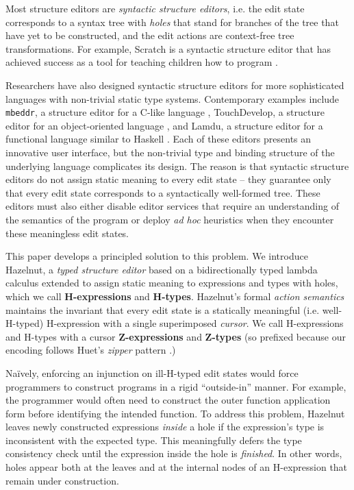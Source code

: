 Most structure editors are \emph{syntactic structure editors}, i.e. the
edit state corresponds to a syntax tree with \emph{holes} that stand for branches of
the tree that have yet to be constructed, and the edit actions are
context-free tree transformations. For example, Scratch is a syntactic
structure editor that has achieved success as a tool for teaching children
how to program \cite{Resnick:2009:SP:1592761.1592779}. %

Researchers have also 
 designed  syntactic structure editors for more sophisticated languages with non-trivial  
static type systems. Contemporary examples include \texttt{mbeddr}, a structure editor for a C-like
language \cite{voelter_mbeddr:_2012}, TouchDevelop, a structure editor for an
object-oriented language \cite{tillmann_touchdevelop:_2011}, and Lamdu, a structure 
editor for a functional language similar to Haskell \cite{lamdu}. Each of
these editors presents an innovative user interface, but the non-trivial
type and binding structure of the underlying language complicates its
design. The reason is that syntactic structure editors do not assign static meaning to every edit state -- they guarantee only that every edit state corresponds to  a 
syntactically well-formed tree. These editors must also either disable editor services that require an understanding of the semantics of the program or deploy \emph{ad hoc} heuristics when they
encounter these meaningless edit states.


This paper develops a principled solution to this problem. We introduce
Hazelnut, a \emph{typed structure editor} based on a bidirectionally typed
lambda calculus extended to assign static meaning to expressions and types
with {holes}, which we call \textbf{H-expressions}
and \textbf{H-types}. Hazelnut's formal \emph{action semantics} maintains
the invariant that every edit state is a statically meaningful
(i.e. well-H-typed) H-expression with a single superimposed \emph{cursor}. We
call H-expressions and H-types with a cursor \textbf{Z-expressions}
and \textbf{Z-types} (so prefixed because our encoding follows
Huet's \emph{zipper} pattern \cite{JFP::Huet1997}.)

Na\"ively, enforcing an injunction on ill-H-typed edit states would force
programmers to construct programs in a rigid ``outside-in'' manner. For
example, the programmer would often need to construct the outer function
application form before identifying the intended function. To address this
problem, Hazelnut leaves newly constructed expressions \emph{inside} a hole
if the expression's type is inconsistent with the expected type. This
meaningfully defers the type consistency check until the expression inside
the hole is \emph{finished}. In other words, holes appear both at the
leaves and at the internal nodes of an H-expression that remain under
construction.

